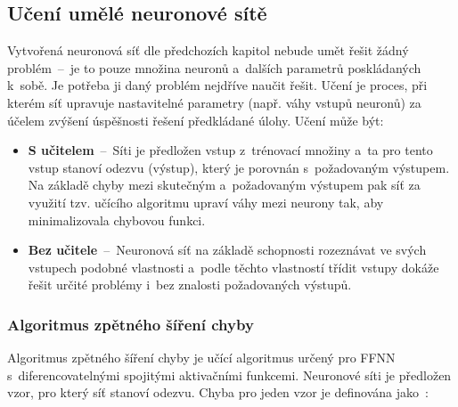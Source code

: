 \documentclass[a4paper,12pt]{article}
\begin{document}
{{{{{{{

{

\subsection{Učení umělé neuronové sítě}

Vytvořená neuronová síť dle předchozích kapitol nebude umět řešit žádný problém~--~je to pouze množina neuronů a~dalších parametrů poskládaných k~sobě. Je potřeba ji daný problém nejdříve naučit řešit. Učení je proces, při kterém síť upravuje nastavitelné parametry (např. váhy vstupů neuronů) za účelem zvýšení úspěšnosti řešení předkládané úlohy. Učení může být:


\begin{itemize}
\item \textbf{S učitelem}~--~Síti je předložen vstup z~trénovací množiny a~ta pro tento vstup stanoví odezvu (výstup), který je porovnán s~požadovaným výstupem. Na základě chyby mezi skutečným a~požadovaným výstupem pak síť za využití tzv. učícího algoritmu upraví váhy mezi neurony tak, aby minimalizovala chybovou funkci.

\item \textbf{Bez učitele}~--~Neuronová síť na základě schopnosti rozeznávat ve svých vstupech podobné vlastnosti a~podle těchto vlastností třídit vstupy dokáže řešit určité problémy i~bez znalosti požadovaných výstupů.~\cite{nn}
\end{itemize}

\subsubsection{Algoritmus zpětného šíření chyby}

Algoritmus zpětného šíření chyby je učící algoritmus určený pro FFNN s~diferencovatelnými spojitými aktivačními funkcemi. Neuronové síti je předložen vzor, pro který síť stanoví odezvu. Chyba pro jeden vzor je definována jako~\cite{nn}:


}}}}}}}}
\end{document}
